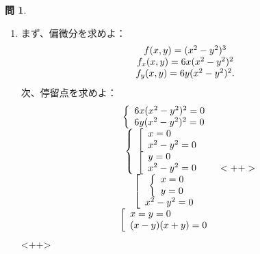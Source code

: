\documentclass[12pt]{article} %
\theoremstyle{definition}
\newtheorem{question}{問}
\begin{document}
\begin{question}
	\begin{enumerate}[(1)]
		\item まず、偏微分を求めよ：
			\begin{equation*}
				\begin{array}[]{c}
					f(x,y)=(x^2-y^2)^3\\
					f_x(x,y)=6x(x^2-y^2)^2\\
					f_y(x,y)=6y(x^2-y^2)^2.\\
				\end{array}
			\end{equation*}
			次、停留点を求めよ：\begin{equation*}
				\begin{array}[]{c}
					\left\{\begin{array}[]{l}
						6x(x^2-y^2)^2=0\\
						6y(x^2-y^2)^2=0\\
					\end{array}\right.\\
					\left\{\begin{array}[]{l}
						\left[\begin{array}[]{l}
							x=0\\
							x^2-y^2=0
						\end{array}\right.\\
						\left[\begin{array}[]{l}
							y=0\\
							x^2-y^2=0
						\end{array}\right.\\
					\end{array}\right.\\
					\left[\begin{array}[]{c}
						\left\{\begin{array}[]{l}
							x=0\\y=0
						\end{array}\right.\\
						x^2-y^2=0
					\end{array}\right.\\
					\left[
						\begin{array}[]{l}
x=y=0\\(x-y)(x+y)=0
						\end{array}
						\right.\\
				\end{array}<++>
			\end{equation*}<++>
	\end{enumerate}
\end{question}
\end{document}
